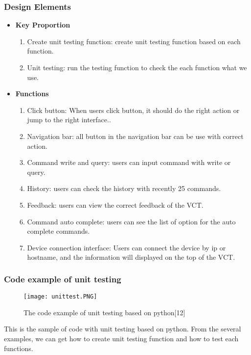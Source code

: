 \documentclass [10pt]{article}
\begin{document}
\subsubsection{Design Elements}
\begin{itemize}
\item \textbf{Key Proportion}
	\begin{enumerate}
	\item Create unit testing function: create unit testing function based on each function.
    \item Unit testing: run the testing function to check the each function what we use. 
    \end{enumerate}
\item \textbf{Functions}
	\begin{enumerate}
    \item Click button: When users click button, it should do the right action or jump to the right interface..
    \item Navigation bar: all button in the navigation bar can be use with correct action.
	\item Command write and query: users can input command with write or query.
    \item History: users can check the history with recently 25 commands.
    \item Feedback: users can view the correct feedback of the VCT.
    \item Command auto complete: users can see the list of option for the auto complete commands.
    \item Device connection interface: Users can connect the device by ip or hostname, and the information will displayed on the top of the VCT.
    \end{enumerate}
\end{itemize}
\subsubsection{Code example of unit testing}
\begin{figure}[ht]
\centering
\texttt{[image: unittest.PNG]}
\caption{The code example of unit testing based on python[12]}
\end{figure}
This is the sample of code with unit testing based on python. From the several examples, we can get how to create unit testing function and how to test each functions.


\pagebreak
\clearpage
\end{document}
